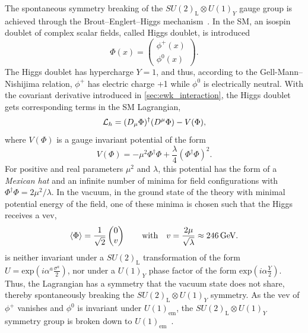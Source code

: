 The spontaneous symmetry breaking of the $SU(2)_\mathrm{L}\otimes U(1)_Y$ gauge group is achieved through the Brout--Englert--Higgs   mechanism~\cite{PhysRevLett.13.321,PhysRevLett.13.508,PhysRev.145.1156}. In the SM, an isospin doublet of complex scalar fields, called Higgs doublet, is introduced
\begin{equation}
	\Phi(x) = \begin{pmatrix}
		\phi^+(x) \\
		\phi^0(x)
	\end{pmatrix}.
\end{equation}
The Higgs doublet has hypercharge $Y=1$, and thus, according to the Gell-Mann--Nishijima relation, $\phi^+$ has electric charge +1 while $\phi^0$ is electrically neutral. With the covariant derivative introduced in \cref{sec:ewk_interaction}, the Higgs doublet gets corresponding terms in the SM Lagrangian, 
\begin{equation}
	\mathcal{L}_h = (\mathop{}\!D_\mu\Phi)^\dagger(\mathop{}\!D^\mu\Phi) - V(\Phi),
	\label{eq:higgs_lagrangian}
\end{equation}
where $V(\Phi)$ is a gauge invariant potential of the form
\begin{equation}
	V(\Phi) = -\mu^2\Phi^\dagger\Phi + \frac{\lambda}{4}(\Phi^\dagger\Phi)^2.
	\label{eq:higgs_potential}
\end{equation}
For positive and real parameters $\mu^2$ and $\lambda$, this potential has the form of a \textit{Mexican hat} and an infinite number of minima for field configurations with $\Phi^\dagger\Phi=2\mu^2/\lambda$. In the vacuum, \ie in the ground state of the theory with minimal potential energy of the field, one of these minima is chosen such that the Higgs  receives a \gls{vev},
\begin{equation}
	\braket{\Phi} = \frac{1}{\sqrt{2}}\begin{pmatrix}
		0 \\
		v
	\end{pmatrix} \qquad \textrm{with} \quad v = \frac{2\mu}{\sqrt{\lambda}} \approx \SI{246}{\GeV}.
	\label{eq:higgs_vev}
\end{equation}
 is neither invariant under a $SU(2)_\mathrm{L}$ transformation of the form $U = \mathrm{exp}(i\alpha^a\frac{\sigma^a}{2})$, nor under a $U(1)_Y$ phase factor of the form $\mathrm{exp}(i\alpha\frac{Y}{2})$. Thus, the Lagrangian has a symmetry that the vacuum state does not share, thereby spontaneously breaking the $SU(2)_\mathrm{L}\otimes U(1)_Y$ symmetry. As the \gls{vev} of $\phi^+$ vanishes and $\phi^0$ is invariant under $U(1)_\mathrm{em}$, the $SU(2)_\mathrm{L}\otimes U(1)_Y$ symmetry group is broken down to $U(1)_\mathrm{em}$~\cite{Brock:1354959}.

